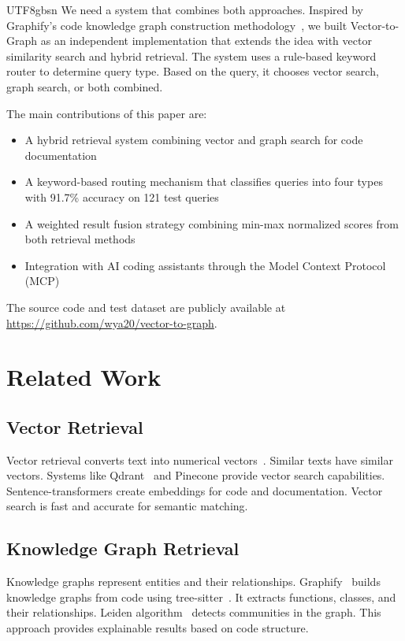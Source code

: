 \documentclass[11pt]{article}
\begin{document}
\begin{CJK*}{UTF8}{gbsn}
We need a system that combines both approaches. Inspired by Graphify's code knowledge graph construction methodology~\cite{graphify2026}, we built Vector-to-Graph as an independent implementation that extends the idea with vector similarity search and hybrid retrieval. The system uses a rule-based keyword router to determine query type. Based on the query, it chooses vector search, graph search, or both combined.

The main contributions of this paper are:

\begin{itemize}
    \item A hybrid retrieval system combining vector and graph search for code documentation
    \item A keyword-based routing mechanism that classifies queries into four types with 91.7\% accuracy on 121 test queries
    \item A weighted result fusion strategy combining min-max normalized scores from both retrieval methods
    \item Integration with AI coding assistants through the Model Context Protocol (MCP)~\cite{mcp2024}
\end{itemize}

The source code and test dataset are publicly available at \url{https://github.com/wya20/vector-to-graph}.

\section{Related Work}

\subsection{Vector Retrieval}
Vector retrieval converts text into numerical vectors~\cite{sentencetransformers2023}. Similar texts have similar vectors. Systems like Qdrant~\cite{qdrant2024} and Pinecone provide vector search capabilities. Sentence-transformers create embeddings for code and documentation. Vector search is fast and accurate for semantic matching.

\subsection{Knowledge Graph Retrieval}
Knowledge graphs represent entities and their relationships. Graphify~\cite{graphify2026} builds knowledge graphs from code using tree-sitter~\cite{trecs2024}. It extracts functions, classes, and their relationships. Leiden algorithm~\cite{leiden2020} detects communities in the graph. This approach provides explainable results based on code structure.


\end{CJK*}
\end{document}
